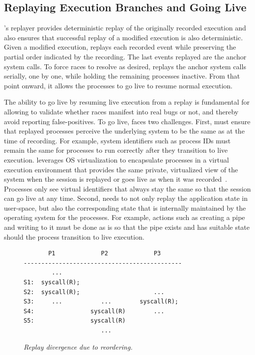 \subsection{Replaying Execution Branches and Going Live}  \label{racepro:sec:reexec}

\racepro's replayer provides deterministic replay of the originally
recorded execution and also ensures that successful replay of a
modified execution is also deterministic.  Given a modified execution,
\racepro replays each recorded event while preserving the partial order
indicated by the recording. The last events replayed are the
anchor system calls. To force races to resolve as desired, \racepro
replays the anchor system calls serially, one by one, while holding
the remaining processes inactive.  From that point onward, it
allows the processes to go live to resume normal execution.

The ability to go live by resuming live execution from a replay is
fundamental for allowing \racepro to validate whether races manifest
into real bugs or not, and thereby avoid reporting false-positives.
To go live, \racepro faces two challenges.  First, \racepro
must ensure that replayed processes perceive the underlying system to
be the same as at the time of recording. For example, system
identifiers such as process IDs must remain the same for processes to
run correctly after they transition to live execution. \racepro leverages
OS virtualization to encapsulate processes in a virtual
execution environment that provides the same private, virtualized view
of the system when the session is replayed or goes live as when it was
recorded~\cite{scribe:sigmetrics10}. Processes only see virtual
identifiers that always stay the same so that the session can go live
at any time.  Second, \racepro needs to not only replay the application
state in user-space, but also the corresponding state that is
internally maintained by the operating system for the processes.  For
example, actions such as creating a pipe and writing to it must be
done as is so that the pipe exists and has suitable state should the
process transition to live execution. 

\begin{figure}[t]
\centering
\begin{minipage}{.65\linewidth}
\begin{footnotesize}
\begin{verbatim}
       P1             P2             P3
---------------------------------------------
        ...
S1:  syscall(R);
S2:  syscall(R);                     ...
S3:     ...           ...        syscall(R);
S4:                syscall(R)        ...
S5:                syscall(R)
                      ...
\end{verbatim}
\end{footnotesize}
\end{minipage}
\caption{\em Replay divergence due to reordering.} \label{racepro:fig:reorder}
\end{figure}

